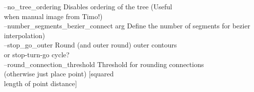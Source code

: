 {  --no\_tree\_ordering                   Disables ordering of the tree (Useful \\
                                       when manual image from Timo!)\\
  --number\_segments\_bezier\_connect arg Define the number of segments for bezier\\
                                       interpolation)\\
  --stop\_go\_outer                      Round (and outer round) outer contours \\
                                       or stop-turn-go cycle?\\
  --round\_connection\_threshold         Threshold for rounding connections \\
                                       (otherwise just place point) [squared \\
                                       length of point distance]
}